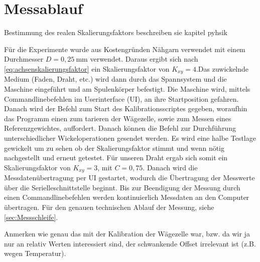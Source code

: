 \section{Messablauf}
\label{sec:Messablauf}



Bestimmung des realen Skalierungsfaktors beschreiben sie kapitel pyhsik

Für die Experimente wurde aus Kostengründen Nähgarn verwendet mit einem Durchmesser $D = 0,25~\si{\milli\metre}$ verwendet. Daraus ergibt sich nach \autoref{eq:achsenskalierungsfaktor} ein Skalierungsfaktor von $K_{xy} = 4$.Das zuwickelnde Medium (Faden, Draht, etc.) wird dann durch das Spannsystem und die Maschine eingeführt und am Spulenkörper befestigt. Die Maschine wird, mittels Commandlinebefehlen im Userinterface (UI), an ihre Startposition gefahren. Danach wird der Befehl zum Start des Kalibrationsscriptes gegeben, woraufhin das Programm einen zum tarieren der Wägezelle, sowie zum Messen eines Referenzgewichtes, auffordert. Danach können die Befehl zur Durchführung unterschiedlicher Wickeloperationen gesendet werden. Es wird eine halbe Testlage gewickelt um zu sehen ob der Skalierungsfaktor stimmt und wenn nötig nachgestellt und erneut getestet. Für unseren Draht ergab sich somit ein Skalierungsfaktor von $K_{xy} = 3$, mit $C = 0,75$. Danach wird die  Messdatenübertragung per UI gestartet, wodurch die Übertragung der Messwerte über die Serielleschnittstelle beginnt. Bis zur Beendigung der Messung durch einen Commandlinebefehlen werden kontinuierlich Messdaten an den Computer übertragen. Für den genauen technischen Ablauf der Messung, siehe \autoref{sec:Messschleife}. 

Anmerken wie genau das mit der Kalibration der Wägezelle war, bzw. da wir ja nur an relativ Werten interessiert sind, der schwankende Offset irrelevant ist (z.B. wegen Temperatur).